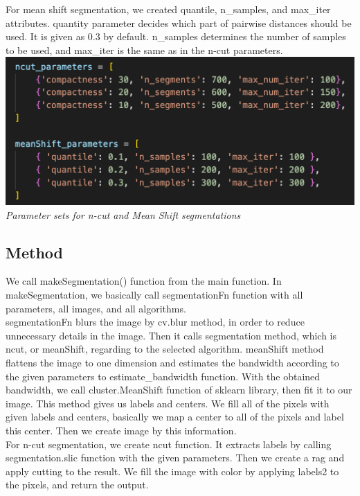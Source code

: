 \documentclass[conference]{IEEEtran}
\begin{document}
For mean shift segmentation, we created quantile, n\_samples, and max\_iter attributes. quantity parameter decides which part of pairwise distances should be used. It is given as 0.3 by default. n\_samples determines the number of samples to be used, and max\_iter is the same as in the n-cut parameters.\\

\includegraphics[width=0.9\linewidth]{parameters.png}
\\
\textit{Parameter sets for n-cut and Mean Shift segmentations}\\

\subsection{Method}

We call makeSegmentation() function from the main function. In makeSegmentation, we basically call segmentationFn function with all parameters, all images, and all algorithms.\\

segmentationFn blurs the image by cv.blur method, in order to reduce unnecessary details in the image. Then it calls segmentation method, which is ncut, or meanShift, regarding to the selected algorithm. meanShift method flattens the image to one dimension and estimates the bandwidth according to the given parameters to estimate\_bandwidth function. With the obtained bandwidth, we call cluster.MeanShift function of sklearn library, then fit it to our image. This method gives us labels and centers. We fill all of the pixels with given labels and centers, basically we map a center to all of the pixels and label this center. Then we create image by this information.\\

For n-cut segmentation, we create ncut function. It extracts labels by calling segmentation.slic function with the given parameters. Then we create a rag and apply cutting to the result. We fill the image with color by applying labels2 to the pixels, and return the output.\\
\end{document}
